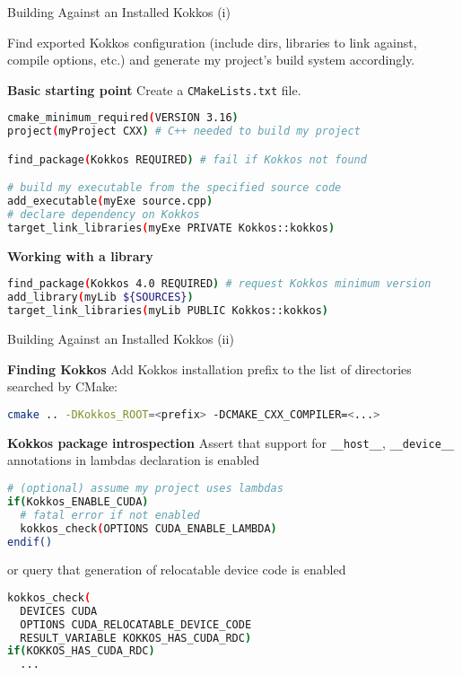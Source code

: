 \begin{frame}[fragile]{Building Against an Installed Kokkos (i)}

Find exported Kokkos configuration (include dirs, libraries to link against, compile options, etc.)
and generate my project's build system accordingly.

\textbf{Basic starting point}
Create a \texttt{CMakeLists.txt} file.
\begin{lstlisting}[language=bash]
cmake_minimum_required(VERSION 3.16)
project(myProject CXX) # C++ needed to build my project

find_package(Kokkos REQUIRED) # fail if Kokkos not found

# build my executable from the specified source code
add_executable(myExe source.cpp)
# declare dependency on Kokkos
target_link_libraries(myExe PRIVATE Kokkos::kokkos)
\end{lstlisting}

\textbf{Working with a library}
\begin{lstlisting}[language=bash]
find_package(Kokkos 4.0 REQUIRED) # request Kokkos minimum version
add_library(myLib ${SOURCES})
target_link_libraries(myLib PUBLIC Kokkos::kokkos)
\end{lstlisting}

\end{frame}

\begin{frame}[fragile]{Building Against an Installed Kokkos (ii)}

\textbf{Finding Kokkos} Add Kokkos installation prefix to the list of directories searched by CMake:
\begin{lstlisting}[language=bash]
cmake .. -DKokkos_ROOT=<prefix> -DCMAKE_CXX_COMPILER=<...>
\end{lstlisting}

\textbf{Kokkos package introspection}
Assert that support for \texttt{\_\_host\_\_}, \texttt{\_\_device\_\_} annotations in lambdas declaration is enabled
\begin{lstlisting}[language=bash]
# (optional) assume my project uses lambdas
if(Kokkos_ENABLE_CUDA)
  # fatal error if not enabled
  kokkos_check(OPTIONS CUDA_ENABLE_LAMBDA)
endif()
\end{lstlisting}
or query that generation of relocatable device code is enabled
\begin{lstlisting}[language=bash]
kokkos_check(
  DEVICES CUDA
  OPTIONS CUDA_RELOCATABLE_DEVICE_CODE
  RESULT_VARIABLE KOKKOS_HAS_CUDA_RDC)
if(KOKKOS_HAS_CUDA_RDC)
  ...
\end{lstlisting}

\end{frame}


